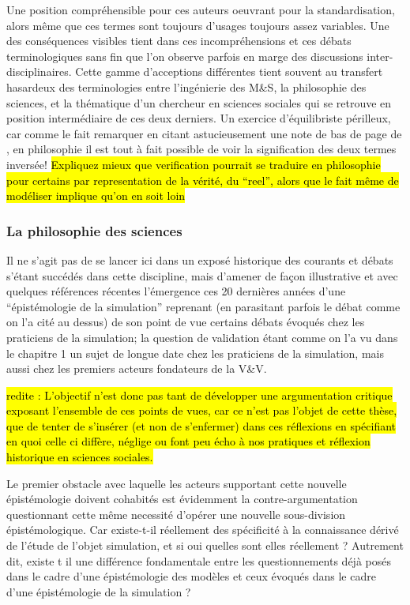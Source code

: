 Une position compréhensible pour ces auteurs oeuvrant pour la standardisation, alors même que ces termes sont toujours d'usages toujours assez variables. Une des conséquences visibles tient dans ces incompréhensions et ces débats terminologiques sans fin \autocite{David2009} que l'on observe parfois en marge des discussions inter-disciplinaires. Cette gamme d'acceptions différentes tient souvent au transfert hasardeux des terminologies entre l'ingénierie des M\&S, la philosophie des sciences, et la thématique d'un chercheur en sciences sociales qui se retrouve en position intermédiaire de ces deux derniers. Un exercice d'équilibriste périlleux, car comme le fait remarquer \textcite{Kleijnen1995} en citant astucieusement une note de bas de page de \textcite{Barlas1990}, en philosophie il est tout à fait possible de voir la signification des deux termes inversée! \hl{Expliquez mieux que verification pourrait se traduire en philosophie pour certains par representation de la vérité, du “reel”, alors que le fait même de modéliser implique qu’on en soit loin}

\subsubsection{La philosophie des sciences}

Il ne s'agit pas de se lancer ici dans un exposé historique des courants et débats s'étant succédés dans cette discipline, mais d'amener de façon illustrative et avec quelques références récentes l'émergence ces 20 dernières années d'une \enquote{épistémologie de la simulation} reprenant (en parasitant parfois le débat comme on l'a cité au dessus) de son point de vue certains débats évoqués chez les praticiens de la simulation; la question de validation étant comme on l'a vu dans le chapitre 1 un sujet de longue date chez les praticiens de la simulation, mais aussi chez les premiers acteurs fondateurs de la V\&V.

\hl{redite : L'objectif n'est donc pas tant de développer une argumentation critique exposant l'ensemble de ces points de vues, car ce n'est pas l'objet de cette thèse, que de tenter de s'insérer (et non de s'enfermer) dans ces réflexions en spécifiant en quoi celle ci diffère, néglige ou font peu écho à nos pratiques et réflexion historique en sciences sociales.}

Le premier obstacle avec laquelle les acteurs supportant cette nouvelle épistémologie doivent cohabités est évidemment la contre-argumentation questionnant cette même necessité d'opérer une nouvelle sous-division épistémologique. Car existe-t-il réellement des spécificité à la connaissance dérivé de l'étude de l'objet simulation, et si oui quelles sont elles réellement ? Autrement dit, existe t il une différence fondamentale entre les questionnements déjà posés dans le cadre d'une épistémologie des modèles et ceux évoqués dans le cadre d'une épistémologie de la simulation ?

